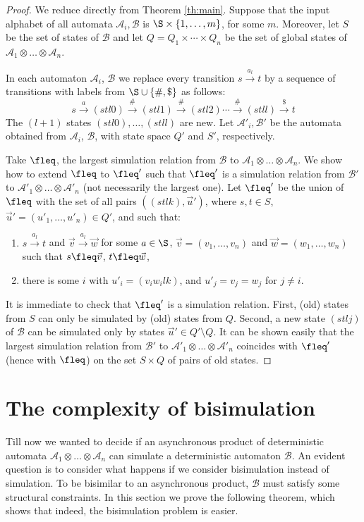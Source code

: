 \documentclass{LMCS}
\theoremstyle{plain}\newtheorem{remark}{Remark}
\theoremstyle{plain}\newtheorem{lemma}[thm]{Lemma}
\renewcommand{\Aa}{\mathcal{A}}
\renewcommand{\Bb}{\mathcal{B}}
\newcommand{\vecu}{\vec u}
\newcommand{\vecv}{\vec v}
\newcommand{\vecw}{\vec w}
\newcommand{\vAa}{\Aa_1\otimes\dots\otimes\Aa_n}
\newcommand{\vAaa}{\Aa'_1\otimes\dots\otimes\Aa'_n}
\newcommand{\trans}[1]{\stackrel{#1}{\longrightarrow}}
\begin{document}
\begin{proof}
  We reduce directly from Theorem \ref{th:main}. Suppose that
  the input alphabet of all automata $\Aa_i,\Bb$ is $\S\times
  \{1,\ldots,m\}$, for some $m$. Moreover,
  let $S$ be the set of states of $\Bb$ and let $Q = Q_1 \times \cdots
  \times Q_n$ be the set of global states of $\vAa$.

  In each automaton $\Aa_i$, $\Bb$ we replace every transition $s
  \trans{a_l} t$ by a sequence of transitions with labels from $\S
  \cup \{\#,\$\}$ as follows:
\[
s \trans{a} (stl0) \trans{\#} (stl1) \trans{\#} (stl2) \cdots
\trans{\#} (stll) \trans{\$} t
\]
The $(l+1)$ states $(stl0),\ldots, (stll)$ are new. Let $\Aa'_i,\Bb'$
be the automata obtained from  $\Aa_i$, $\Bb$, with state space $Q'$ and $S'$,
respectively.

Take $\fleq$, the largest simulation relation from $\Bb$
to $\vAa$. We show how to extend $\fleq$ to $\fleq'$
such that $\fleq'$ is a simulation relation from $\Bb'$
to $\vAaa$ (not necessarily the largest one). Let $\fleq'$ be the union of $\fleq$ with 
the set of all pairs $((stlk), \vecu')$, where 
$s,t \in S$, $\vecu'=(u'_1,\ldots,u'_n) \in Q'$, and
such that:

\begin{enumerate}[$\bullet$]
\item $s \trans{a_l} t$ and $\vecv \trans{a_l} \vecw$ for some $a\in \S$,
  $\vecv=(v_1,\dots,v_n)$ and $\vecw=(w_1,\dots,w_n)$ such that
  $s\fleq \vecv$, $t\fleq \vecw$,

\item there is some $i$ with $u'_i=(v_iw_ilk)$, and $u'_j=v_j=w_j$ for
  $j\not=i$.
\end{enumerate}
It is immediate to check that $\fleq'$ is a simulation relation.
First, (old) states from $S$ can only be simulated by (old) states
from $Q$.  Second, a new state $(stlj)$ of $\Bb$ can be simulated only
by states $\vecu' \in Q' \setminus Q$. It can be shown easily that the
largest simulation relation from $\Bb'$ to $\vAaa$ coincides with
$\fleq'$ (hence with $\fleq$) on the set $S \times Q$ of pairs of old
states. 

\end{proof}

\section{The complexity of bisimulation}


Till now we  wanted to decide if an asynchronous product of
deterministic automata $\vAa$ can simulate a
deterministic automaton $\Bb$. An evident question is to consider what
happens if we consider bisimulation instead  of simulation. To be
bisimilar to an asynchronous product, $\Bb$ must satisfy some 
structural constraints. In this section we prove the following theorem,
which shows that indeed, the bisimulation problem is easier. 
\end{document}

